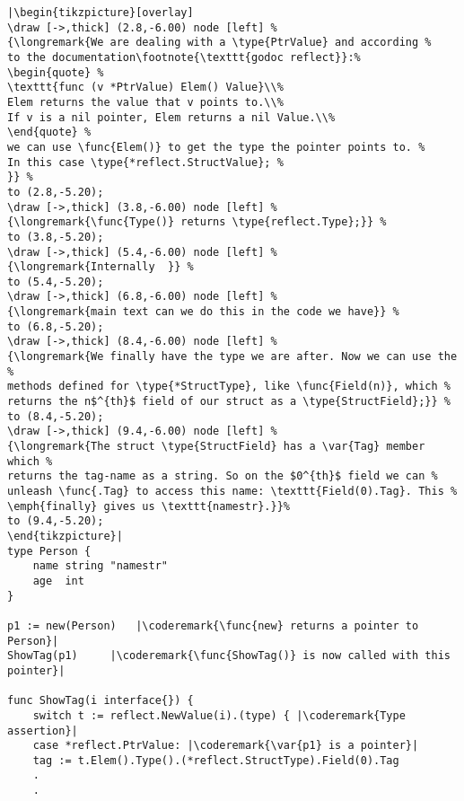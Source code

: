 \begin{lstlisting}[caption=Introspection using reflection,label=src:introspection]
|\begin{tikzpicture}[overlay]
\draw [->,thick] (2.8,-6.00) node [left] %
{\longremark{We are dealing with a \type{PtrValue} and according %
to the documentation\footnote{\texttt{godoc reflect}}:%
\begin{quote} %
\texttt{func (v *PtrValue) Elem() Value}\\%
Elem returns the value that v points to.\\%
If v is a nil pointer, Elem returns a nil Value.\\%
\end{quote} %
we can use \func{Elem()} to get the type the pointer points to. %
In this case \type{*reflect.StructValue}; %
}} %
to (2.8,-5.20);
\draw [->,thick] (3.8,-6.00) node [left] %
{\longremark{\func{Type()} returns \type{reflect.Type};}} %
to (3.8,-5.20);
\draw [->,thick] (5.4,-6.00) node [left] %
{\longremark{Internally  }} %
to (5.4,-5.20);
\draw [->,thick] (6.8,-6.00) node [left] %
{\longremark{main text can we do this in the code we have}} %
to (6.8,-5.20);
\draw [->,thick] (8.4,-6.00) node [left] %
{\longremark{We finally have the type we are after. Now we can use the %
methods defined for \type{*StructType}, like \func{Field(n)}, which %
returns the n$^{th}$ field of our struct as a \type{StructField};}} %
to (8.4,-5.20);
\draw [->,thick] (9.4,-6.00) node [left] %
{\longremark{The struct \type{StructField} has a \var{Tag} member which %
returns the tag-name as a string. So on the $0^{th}$ field we can %
unleash \func{.Tag} to access this name: \texttt{Field(0).Tag}. This %
\emph{finally} gives us \texttt{namestr}.}}%
to (9.4,-5.20);
\end{tikzpicture}|
type Person {
    name string "namestr"
    age  int
}

p1 := new(Person)   |\coderemark{\func{new} returns a pointer to Person}|
ShowTag(p1)	    |\coderemark{\func{ShowTag()} is now called with this pointer}|

func ShowTag(i interface{}) {
    switch t := reflect.NewValue(i).(type) { |\coderemark{Type assertion}|
    case *reflect.PtrValue: |\coderemark{\var{p1} is a pointer}|
	tag := t.Elem().Type().(*reflect.StructType).Field(0).Tag
	.
	.
\end{lstlisting}
